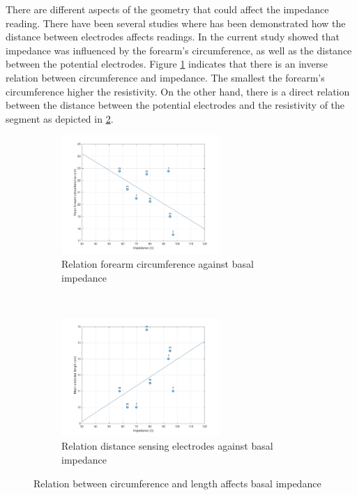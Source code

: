 There are different aspects of the geometry that could affect the impedance reading. There have been several studies where has been demonstrated how the distance between electrodes affects readings. In the current study showed that impedance was influenced by the forearm's circumference, as well as the distance between the potential electrodes. Figure \ref{fig:C_vs_Z} indicates that there is an inverse relation between circumference and impedance. The smallest the forearm's circumference higher the resistivity. On the other hand, there is a direct relation between the distance between the potential electrodes and the resistivity of the segment as depicted in \ref{fig:l_vs_Z}.

\begin{figure}[t!]
	\centering
	\begin{subfigure}[t]{0.5\textwidth}
		\centering
		\includegraphics[height=4.5cm]{figure2a}
		\caption{Relation forearm circumference against basal impedance}
		\label{fig:C_vs_Z}
	\end{subfigure}%
	~ 
	\begin{subfigure}[t]{0.5\textwidth}
		\centering
		\includegraphics[height=4.5cm]{figure2b}
		\caption{Relation distance sensing electrodes against basal impedance}
		\label{fig:l_vs_Z}
	\end{subfigure}
	\caption{Relation between circumference and length affects basal impedance}
	\label{fig:relation_geometry_vs_impedance}
\end{figure}


